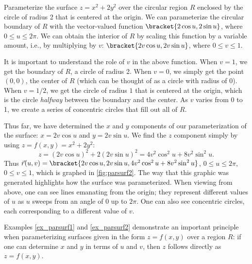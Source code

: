 \begin{example}\label{ex_parsurf2}%
Parameterize the surface $z=x^2+2y^2$ over the circular region $R$ enclosed by the circle of radius 2 that is centered at the origin.
%
%
\solution
We can parameterize the circular boundary of $R$ with the vector-valued function $\bracket{2\cos u,2\sin u}$, where $0\leq u\leq 2\pi$. We can obtain the interior of $R$ by scaling this function by a variable amount, i.e., by multiplying by $v$: $\bracket{2v\cos u,2v\sin u}$, where $0\leq v\leq 1$.

It is important to understand the role of $v$ in the above function. When $v=1$, we get the boundary of $R$, a circle of radius 2. When $v=0$, we simply get the point $(0,0)$, the center of $R$ (which can be thought of as a circle with radius of 0). When $v=1/2$, we get the circle of radius $1$ that is centered at the origin, which is the circle \emph{halfway} between the boundary and the center. As $v$ varies from 0 to 1, we create a series of concentric circles that fill out all of $R$.

Thus far, we have determined the $x$ and $y$ components of our parameterization of the surface: $x=2v\cos u$ and $y=2v\sin u$. We find the $z$ component simply by using $z = f(x,y) = x^2+2y^2$: 
\[z = (2v\cos u)^2+2(2v\sin u)^2 = 4v^2\cos^2u+8v^2\sin^2u.\]
Thus $\vec r(u,v) =\bracket{2v\cos u,2v\sin u,4v^2\cos^2u+8v^2\sin^2u}$, $0\leq u\leq 2\pi$, $0\leq v\leq 1$, which is graphed in \autoref{fig:parsurf2}. The way that this graphic was generated highlights how the surface was parameterized. When viewing from above, one can see lines emanating from the origin; they represent different values of $u$ as $u$ sweeps from an angle of 0 up to $2\pi$. One can also see concentric circles, each corresponding to a different value of $v$.
\end{example}

Examples \ref{ex_parsurf1} and \ref{ex_parsurf2} demonstrate an important principle when parameterizing surfaces given in the form $z=f(x,y)$ over a region $R$: if one can determine $x$ and $y$ in terms of $u$ and $v$, then $z$ follows directly as $z=f(x,y)$. 

